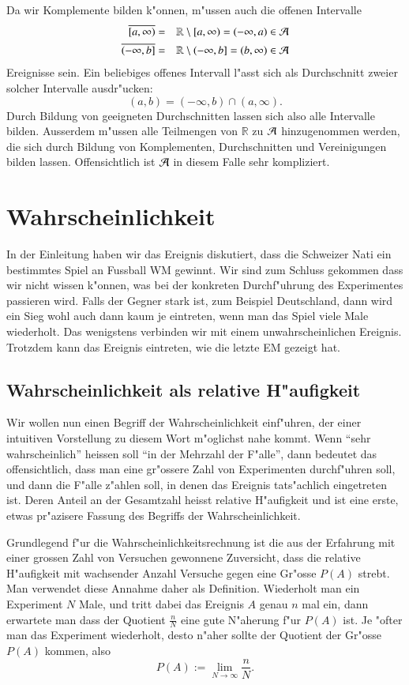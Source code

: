 Da wir Komplemente bilden k"onnen, m"ussen auch die offenen Intervalle
\begin{eqnarray*}
\overline{[a,\infty)}&=&\mathbb R\setminus [a,\infty)=(-\infty,a)\in\cal A\\
\overline{(-\infty,b]}&=&\mathbb R\setminus (-\infty,b]= (b,\infty)\in\cal A\\
\end{eqnarray*}
Ereignisse sein. Ein beliebiges offenes Intervall l"asst sich
als Durchschnitt zweier solcher Intervalle ausdr"ucken:
\[
(a,b)=(-\infty, b)\cap(a,\infty).
\]
Durch Bildung von geeigneten Durchschnitten lassen sich also alle
Intervalle bilden. Ausserdem m"ussen alle Teilmengen von $\mathbb R$
zu $\cal A$ hinzugenommen werden, die sich durch Bildung von Komplementen,
Durchschnitten und Vereinigungen bilden lassen. Offensichtlich ist $\cal A$
in diesem Falle sehr kompliziert.

\section{Wahrscheinlichkeit\label{section-wahrscheinlichkeit}}
In der Einleitung haben wir das Ereignis diskutiert, dass die Schweizer
Nati ein bestimmtes Spiel an Fussball WM gewinnt. Wir sind zum Schluss
gekommen dass wir nicht wissen k"onnen, was bei der konkreten
Durchf"uhrung des Experimentes passieren wird. Falls der Gegner
stark ist, zum Beispiel Deutschland, dann wird ein Sieg wohl auch
dann kaum je eintreten, wenn man das Spiel viele Male wiederholt.
Das wenigstens verbinden wir mit einem unwahrscheinlichen Ereignis.
Trotzdem kann das Ereignis eintreten, wie die letzte EM gezeigt hat.


\subsection{Wahrscheinlichkeit als relative H"aufigkeit}
Wir wollen nun einen Begriff der Wahrscheinlichkeit einf"uhren, der
einer intuitiven Vorstellung zu diesem Wort m"oglichst nahe kommt.
Wenn ``sehr
wahrscheinlich'' heissen soll ``in der Mehrzahl der F"alle'', dann
bedeutet das offensichtlich, dass man eine gr"ossere Zahl von
Experimenten durchf"uhren soll, und dann die F"alle z"ahlen soll,
in denen das Ereignis tats"achlich eingetreten ist. Deren Anteil
an der Gesamtzahl heisst relative H"aufigkeit und ist eine erste,
etwas pr"azisere Fassung des Begriffs der Wahrscheinlichkeit. 

Grundlegend f"ur die Wahrscheinlichkeitsrechnung ist die aus der
Erfahrung mit einer grossen Zahl von Versuchen gewonnene Zuversicht,
dass die relative H"aufigkeit mit wachsender Anzahl Versuche gegen
eine Gr"osse $P(A)$ strebt. Man verwendet diese Annahme daher als
Definition. Wiederholt
man ein Experiment $N$ Male, und tritt dabei das Ereignis $A$
genau $n$ mal ein, dann erwartete man dass der Quotient $\frac{n}{N}$
eine gute N"aherung f"ur $P(A)$ ist. Je "ofter man das Experiment
wiederholt, desto n"aher sollte der Quotient der Gr"osse $P(A)$
kommen, also
\[
P(A) := \lim_{N\to\infty}\frac{n}{N}.
\]

